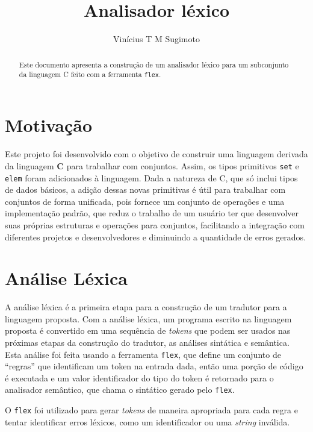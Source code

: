 \documentclass{llncs}
\title{Analisador léxico}
\author{Vinícius T M Sugimoto}
\institute{CiC-UnB}
\begin{document}
\maketitle
\begin{abstract}
	\hfuzz=3pt
	Este documento apresenta a construção de um analisador léxico para um subconjunto da linguagem C feito com a ferramenta \texttt{flex}.
\end{abstract}

\section{Motivação}
\label{sec:motivacao} Este projeto foi desenvolvido com o objetivo de construir uma linguagem derivada da linguagem \textbf{C} para trabalhar com conjuntos. Assim, os tipos primitivos \texttt{set} e \texttt{elem} foram adicionados à linguagem. Dada a natureza de C, que só inclui tipos de dados básicos, a adição dessas novas primitivas é útil para trabalhar com conjuntos de forma unificada, pois fornece um conjunto de operações e uma implementação padrão, que reduz o trabalho de um usuário ter que desenvolver suas próprias estruturas e operações para conjuntos, facilitando a integração com diferentes projetos e desenvolvedores e diminuindo a quantidade de erros gerados.

\section{Análise Léxica}
\label{sec:analise_lexica}
A análise léxica é a primeira etapa para a construção de um tradutor para a linguagem proposta. Com a análise léxica, um programa escrito na linguagem proposta é convertido em uma sequência de \textit{tokens} que podem ser usados nas próximas etapas da construção do tradutor, as análises sintática e semântica. Esta análise foi feita usando a ferramenta \texttt{flex}, que define um conjunto de ``regras'' que identificam um token na entrada dada, então uma porção de código é executada e um valor identificador do tipo do token é retornado para o analisador semântico, que chama o sintático gerado pelo \texttt{flex}.

O \texttt{flex} foi utilizado para gerar \textit{tokens} de maneira apropriada para cada regra e tentar identificar erros léxicos, como um identificador ou uma \textit{string} inválida.
\end{document}
